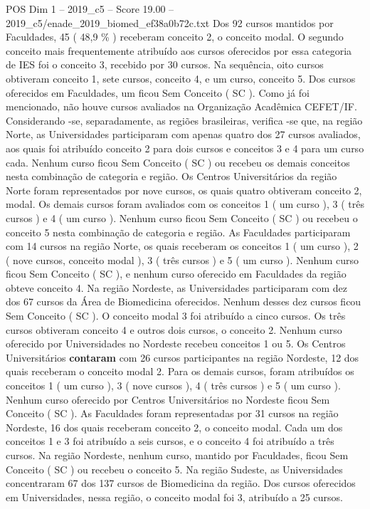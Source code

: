 \begin{textsample}{POS Dim 1 – 2019\_c5 – Score 19.00 – 2019\_c5/enade\_2019\_biomed\_ef38a0b72c.txt}
Dos 92 cursos mantidos por Faculdades, 45 ( 48,9 \% ) receberam conceito 2, o conceito modal.
O segundo conceito mais frequentemente atribuído aos cursos oferecidos por essa categoria de IES foi o conceito 3, recebido por 30 cursos.
Na sequência, oito cursos obtiveram conceito 1, sete cursos, conceito 4, e um curso, conceito 5.
Dos cursos oferecidos em Faculdades, um ficou Sem Conceito ( SC ).
Como já foi mencionado, não houve cursos avaliados na Organização Acadêmica CEFET/IF.
Considerando -se, separadamente, as regiões brasileiras, verifica -se que, na região Norte, as Universidades participaram com apenas quatro dos 27 cursos avaliados, aos quais foi atribuído conceito 2 para dois cursos e conceitos 3 e 4 para um curso cada.
Nenhum curso ficou Sem Conceito ( SC ) ou recebeu os demais conceitos nesta combinação de categoria e região.
Os Centros Universitários da região Norte foram representados por nove cursos, os quais quatro obtiveram conceito 2, modal.
Os demais cursos foram avaliados com os conceitos 1 ( um curso ), 3 ( três cursos ) e 4 ( um curso ).
Nenhum curso ficou Sem Conceito ( SC ) ou recebeu o conceito 5 nesta combinação de categoria e região.
As Faculdades participaram com 14 cursos na região Norte, os quais receberam os conceitos 1 ( um curso ), 2 ( nove cursos, conceito modal ), 3 ( três cursos ) e 5 ( um curso ).
Nenhum curso ficou Sem Conceito ( SC ), e nenhum curso oferecido em Faculdades da região obteve conceito 4.
Na região Nordeste, as Universidades participaram com dez dos 67 cursos da Área de Biomedicina oferecidos.
Nenhum desses dez cursos ficou Sem Conceito ( SC ).
O conceito modal 3 foi atribuído a cinco cursos.
Os três cursos obtiveram conceito 4 e outros dois cursos, o conceito 2.
Nenhum curso oferecido por Universidades no Nordeste recebeu conceitos 1 ou 5.
Os Centros Universitários \textbf{contaram} com 26 cursos participantes na região Nordeste, 12 dos quais receberam o conceito modal 2.
Para os demais cursos, foram atribuídos os conceitos 1 ( um curso ), 3 ( nove cursos ), 4 ( três cursos ) e 5 ( um curso ).
Nenhum curso oferecido por Centros Universitários no Nordeste ficou Sem Conceito ( SC ).
As Faculdades foram representadas por 31 cursos na região Nordeste, 16 dos quais receberam conceito 2, o conceito modal.
Cada um dos conceitos 1 e 3 foi atribuído a seis cursos, e o conceito 4 foi atribuído a três cursos.
Na região Nordeste, nenhum curso, mantido por Faculdades, ficou Sem Conceito ( SC ) ou recebeu o conceito 5.
Na região Sudeste, as Universidades concentraram 67 dos 137 cursos de Biomedicina da região.
Dos cursos oferecidos em Universidades, nessa região, o conceito modal foi 3, atribuído a 25 cursos.

\end{textsample}
